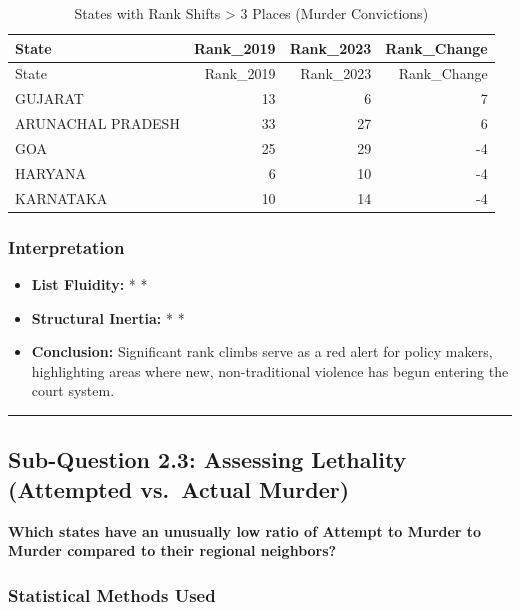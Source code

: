 \documentclass[
]{article}
\providecommand{\tightlist}{%
  \setlength{\itemsep}{0pt}\setlength{\parskip}{0pt}}
\begin{document}
\begin{longtable}[]{@{}lrrr@{}}
\caption{States with Rank Shifts \textgreater{} 3 Places (Murder
Convictions)}\tabularnewline
\toprule\noalign{}
State & Rank\_2019 & Rank\_2023 & Rank\_Change \\
\midrule\noalign{}
\endfirsthead
\toprule\noalign{}
State & Rank\_2019 & Rank\_2023 & Rank\_Change \\
\midrule\noalign{}
\endhead
\bottomrule\noalign{}
\endlastfoot
GUJARAT & 13 & 6 & 7 \\
ARUNACHAL PRADESH & 33 & 27 & 6 \\
GOA & 25 & 29 & -4 \\
HARYANA & 6 & 10 & -4 \\
KARNATAKA & 10 & 14 & -4 \\
\end{longtable}

\subsubsection{Interpretation}\label{interpretation-1}

\begin{itemize}
\tightlist
\item
  \textbf{List Fluidity:} * *
\item
  \textbf{Structural Inertia:} * *
\item
  \textbf{Conclusion:} Significant rank climbs serve as a red alert for
  policy makers, highlighting areas where new, non-traditional violence
  has begun entering the court system.
\end{itemize}

\begin{center}\rule{0.5\linewidth}{0.5pt}\end{center}

\subsection{Sub-Question 2.3: Assessing Lethality (Attempted vs.~Actual
Murder)}\label{sub-question-2.3-assessing-lethality-attempted-vs.-actual-murder}

\textbf{Which states have an unusually low ratio of Attempt to Murder to
Murder compared to their regional neighbors?}

\subsubsection{Statistical Methods
Used}\label{statistical-methods-used-2}
\end{document}
